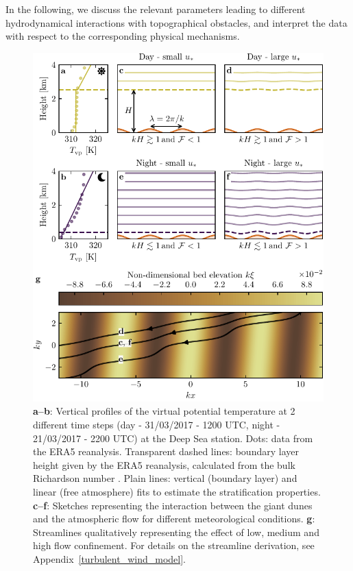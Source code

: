   In the following, we discuss the relevant parameters leading to different hydrodynamical interactions with topographical obstacles, and interpret the data with respect to the corresponding physical mechanisms.

  \begin{figure}
    \centering
    \includegraphics[scale=1]{Figures/Figure4.pdf}
    \caption{\textbf{a--b}: Vertical profiles of the virtual potential temperature at 2 different time steps (day - 31/03/2017 - 1200 UTC, night - 21/03/2017 - 2200 UTC) at the Deep Sea station. Dots: data from the ERA5 reanalysis. Transparent dashed lines: boundary layer height given by the ERA5 reanalysis, calculated from the bulk Richardson number \citep{seidel2012}. Plain lines: vertical (boundary layer) and linear (free atmosphere) fits to estimate the stratification properties. \textbf{c--f}: Sketches representing the interaction between the giant dunes and the atmospheric flow for different meteorological conditions. \textbf{g}: Streamlines qualitatively representing the effect of low, medium and high flow confinement. For details on the streamline derivation, see Appendix~\ref{turbulent_wind_model}.}
    \label{Fig4}
  \end{figure}

